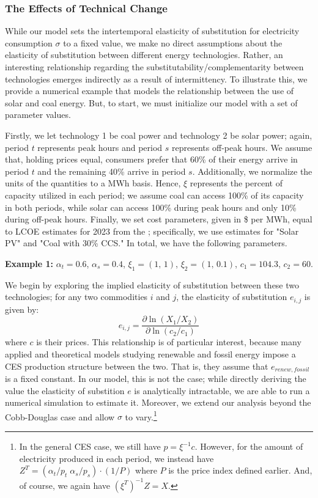 \documentclass[11pt,a4paper]{extarticle}
\begin{document}
\subsubsection{The Effects of Technical Change}

While our model sets the intertemporal elasticity of substitution for  electricity consumption $\sigma$ to a fixed value, we make no direct assumptions about the elasticity of substitution between different energy technologies. Rather, an interesting relationship regarding the substitutability/complementarity between technologies emerges indirectly as a result of intermittency. To illustrate this, we provide a numerical example that models the relationship between the use of solar and coal energy. But, to start, we must initialize our model with a set of parameter values. 

Firstly, we let technology 1 be coal power and technology 2 be solar power; again, period $t$ represents peak hours and period $s$ represents off-peak hours. We assume that, holding prices equal, consumers prefer that 60\% of their energy arrive in period $t$ and the remaining 40\% arrive in period $s$. Additionally, we normalize the units of the quantities to a MWh basis. Hence, $\xi$ represents the percent of capacity utilized in each period; we assume coal can access 100\% of its capacity in both periods, while solar can access 100\% during peak hours and only 10\% during off-peak hours. Finally, we set cost parameters, given in  \$ per MWh, equal to LCOE estimates for 2023 from the \citet{EIALCOE}; specifically, we use estimates for "Solar PV" and "Coal with 30\% CCS." In total, we have the following parameters. 

\begin{center}
	\noindent \textbf{Example  1:} $\alpha_t = 0.6$, $\alpha_s = 0.4$, $\xi_1 = (1, \, 1)$, $\xi_2 = (1, \, 0.1)$, $c_1 = 104.3$, $c_2 = 60$. 
\end{center}

\noindent We begin by exploring the implied elasticity of substitution between these two technologies; for any two commodities $i$ and $j$,  the elasticity of substitution $e_{i,j}$ is given by:
$$e_{i,j} = \frac{\partial \ln (X_1/ X_2)}{\partial \ln (c_2/c_1)}$$
where $c$ is their prices. This relationship is of particular interest, because many applied and theoretical models studying renewable and fossil energy impose a CES production structure between the two. That is, they assume that $e_{renew, fossil}$ is a fixed constant. In our model, this is not the case; while directly deriving the value the elasticity of substition $e$ is analytically intractable, we are able to run a numerical simulation to estimate it. Moreover, we extend our analysis beyond the Cobb-Douglas case and allow $\sigma$ to vary.\footnote{In the general CES case, we still have $p = \xi^{-1} c$. However, for the amount of electricity produced in each period, we instead have $Z^T = \left( \alpha_t/p_t \; \alpha_s /p_s \right) \cdot (1/P)$ where $P$ is the price index defined earlier. And, of course, we again have $(\xi^T)^{-1} Z = X$.} 
\end{document}
